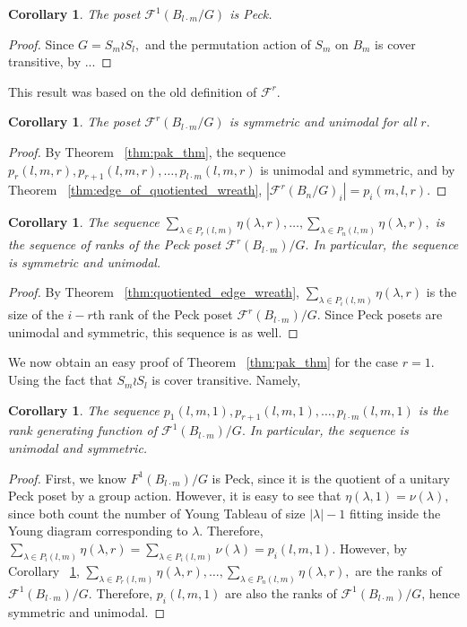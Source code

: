 \documentclass{amsart}
\newtheorem{cor}[thm]{Corollary}
\theoremstyle{remark}
\begin{document}
\begin{cor}
\label{cor:peck_wreath_1}
The poset $\mathcal F^1(B_{l\cdot m}/G)$ is Peck.
\end{cor}
\begin{proof}
Since $G = S_m \wr S_l,$ and the permutation action of $S_m$ on $B_m$ is cover transitive, by ...
\end{proof}

This result was based on the old definition of $\mathcal F^r.$

\begin{cor}
The poset $\mathcal F^r(B_{l\cdot m}/G)$ is symmetric and unimodal for all $r.$
\end{cor}
\begin{proof}
By Theorem ~\ref{thm:pak_thm}, the sequence $p_r(l,m,r), p_{r+1}(l,m,r),\ldots, p_{l\cdot m}(l,m,r)$ is unimodal and symmetric, and by Theorem ~\ref{thm:edge_of_quotiented_wreath}, $|\mathcal F^r(B_n/G)_i| = p_i(m,l,r).$
\end{proof}

\fi

\begin{cor}
\label{cor:unimodal_wreath_r_sequence}
The sequence $\sum_{\lambda \in P_r(l,m)} \eta(\lambda,r),\ldots,\sum_{\lambda \in P_n(l,m)} \eta(\lambda,r),$ is the sequence of ranks of the Peck poset $\mathcal F^r(B_{l\cdot m})/G.$ In particular, the sequence is symmetric and unimodal.
\end{cor}
\begin{proof}
By Theorem ~\ref{thm:quotiented_edge_wreath}, $\sum_{\lambda \in P_i(l,m)} \eta(\lambda,r)$ is the size of the $i-r$th rank of the Peck poset $\mathcal F^r(B_{l\cdot m})/G.$ Since Peck posets are unimodal and symmetric, this sequence is as well.
\end{proof}

We now obtain an easy proof of Theorem ~\ref{thm:pak_thm} for the case $r = 1.$ Using the fact that $S_m\wr S_l$ is cover transitive. Namely,

\begin{cor}
\label{cor:rank_gen_fn_wreath_1}
The sequence $p_1(l,m,1), p_{r+1}(l,m,1),\ldots, p_{l\cdot m}(l,m,1)$ is the rank generating function of $\mathcal F^1(B_{l\cdot m})/G.$ In particular, the sequence is unimodal and symmetric.
\end{cor}
\begin{proof}
First, we know $F^1(B_{l\cdot m})/G$ is Peck, since it is the quotient of a unitary Peck poset by a group action. However, it is easy to see that $\eta(\lambda,1) = \nu(\lambda),$ since both count the number of Young Tableau of size $|\lambda|-1$ fitting inside the Young diagram corresponding to $\lambda.$ Therefore, $\sum_{\lambda \in P_i(l,m)} \eta(\lambda,r) = \sum_{\lambda \in P_i(l,m)}\nu(\lambda) = p_i(l,m,1).$ However, by Corollary ~\ref{cor:unimodal_wreath_r_sequence}, $\sum_{\lambda \in P_r(l,m)} \eta(\lambda,r),\ldots,\sum_{\lambda \in P_n(l,m)} \eta(\lambda,r),$ are the ranks of $\mathcal F^1(B_{l\cdot m})/G.$ Therefore, $p_i(l,m,1)$ are also the ranks of $\mathcal F^1(B_{l\cdot m})/G$, hence symmetric and unimodal.
\end{proof}
\end{document}
